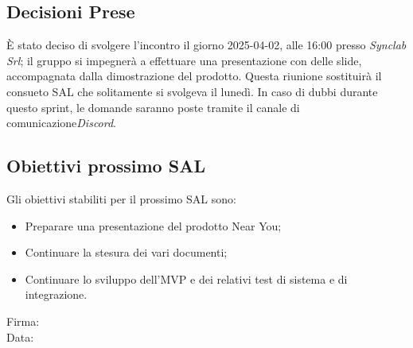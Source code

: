 \documentclass[10pt]{article}
\begin{document}
\subsection{Decisioni Prese}
È stato deciso di svolgere l'incontro il giorno 2025-04-02, alle 16:00 presso \textit{Synclab Srl}; il gruppo si impegnerà a effettuare una presentazione con delle slide, accompagnata dalla dimostrazione del prodotto. Questa riunione sostituirà il consueto SAL che solitamente si svolgeva il lunedì. In caso di dubbi durante questo sprint, le domande saranno poste tramite il canale di comunicazione\textit{Discord}.

\subsection{Obiettivi prossimo SAL} 
Gli obiettivi stabiliti per il prossimo SAL sono:
    \begin{itemize}
            \item Preparare una presentazione del prodotto Near You;
            \item Continuare la stesura dei vari documenti;
            \item Continuare lo sviluppo dell'MVP e dei relativi test di sistema e di integrazione.
    \end{itemize}

\vfill
\begin{minipage}{10cm}
Firma: \hrulefill \\
\vspace{2mm}
Data: \dotfill
\end{minipage}
\end{document}

